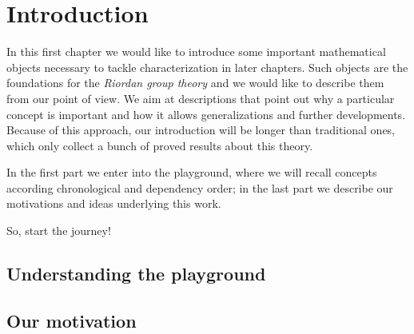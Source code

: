 
\chapter{Introduction}

In this first chapter we would like to introduce some
important mathematical objects necessary to tackle 
characterization in later chapters. Such objects are the 
foundations for the \emph{Riordan group theory} and 
we would like to describe them from our point of view.
We aim at descriptions that point out why a particular 
concept is important and how it allows generalizations
and further developments. Because of this approach,
our introduction will be longer than traditional ones,
which only collect a bunch of proved results about this theory.

In the first part we enter into the playground, where
we will recall concepts according chronological and
dependency order; in the last part we describe our motivations
and ideas underlying this work. 

So, start the journey!

\section{Understanding the playground}









\section{Our motivation}
